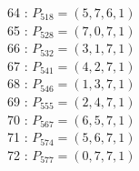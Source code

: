 \documentclass{article}
\begin{document}
{\begin{multicols}{3}
64 : $P_{518}=( 5, 7, 6, 1 )$\\
65 : $P_{528}=( 7, 0, 7, 1 )$\\
66 : $P_{532}=( 3, 1, 7, 1 )$\\
67 : $P_{541}=( 4, 2, 7, 1 )$\\
68 : $P_{546}=( 1, 3, 7, 1 )$\\
69 : $P_{555}=( 2, 4, 7, 1 )$\\
70 : $P_{567}=( 6, 5, 7, 1 )$\\
71 : $P_{574}=( 5, 6, 7, 1 )$\\
72 : $P_{577}=( 0, 7, 7, 1 )$\\
\end{multicols}


%


%


}%
\end{document}
